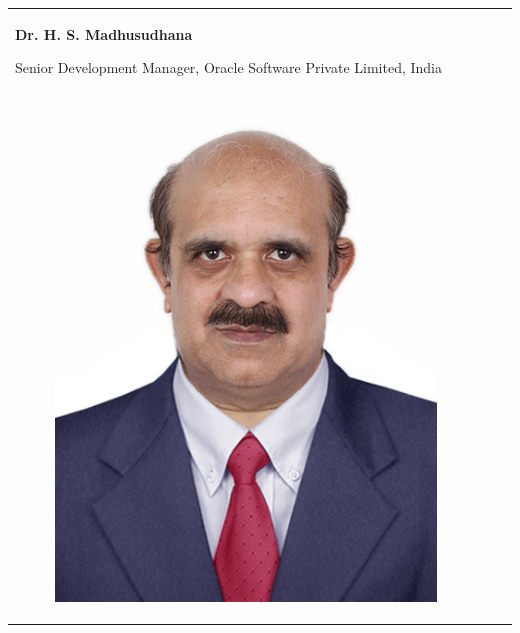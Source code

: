 \newpage
{\tabcolsep=10pt
\renewcommand{\arraystretch}{1.7}
\begin{longtable}{V{2.5}p{.95\textwidth}V{2.5}}
\centerline{\large\bf Dr. H. S. Madhusudhana}

\medskip
\centerline{Senior Development Manager, Oracle Software Private Limited, India}\\[-.5cm]
\begin{figure}
\vspace{-10pt}

\includegraphics{src/Figures/authors/Madhu.jpg}


\end{figure}
\end{longtable}}
